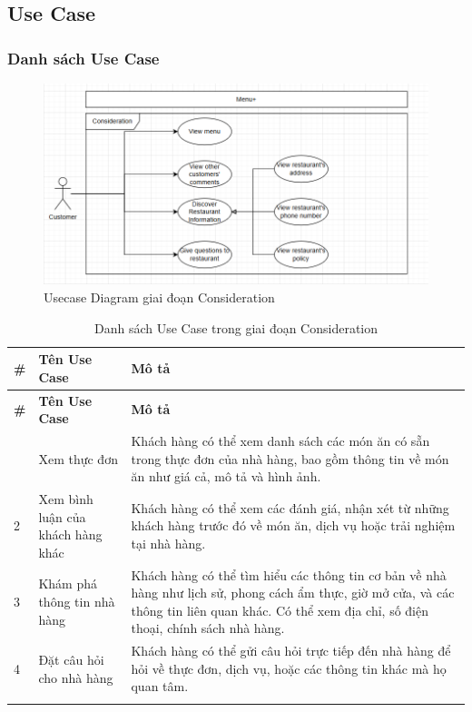 \subsection{Use Case}
    \subsubsection{Danh sách Use Case}
        \begin{figure}[H]
	\centering
	\includegraphics[width=\linewidth]{Images/ucd-consideration.png}
	\caption{Usecase Diagram giai đoạn Consideration}
        \end{figure}
        
        \begin{longtable}{|p{1cm}|p{5cm}|p{9cm}|}
        \hline
        \textbf{\#} & \textbf{Tên Use Case} & \textbf{Mô tả} \\ 
        \hline
        \endfirsthead
        \hline
        \textbf{\#} & \textbf{Tên Use Case} & \textbf{Mô tả} \\ 
        \endhead
        \hline
        \endfoot
        \hline
        \endlastfoot
        1 & Xem thực đơn & Khách hàng có thể xem danh sách các món ăn có sẵn trong thực đơn của nhà hàng, bao gồm thông tin về món ăn như giá cả, mô tả và hình ảnh. \\ 
        \hline
        2 & Xem bình luận của khách hàng khác & Khách hàng có thể xem các đánh giá, nhận xét từ những khách hàng trước đó về món ăn, dịch vụ hoặc trải nghiệm tại nhà hàng. \\ 
        \hline
        3 & Khám phá thông tin nhà hàng & Khách hàng có thể tìm hiểu các thông tin cơ bản về nhà hàng như lịch sử, phong cách ẩm thực, giờ mở cửa, và các thông tin liên quan khác. Có thể xem địa chỉ, số điện thoại, chính sách nhà hàng.\\ 
        \hline
        4 & Đặt câu hỏi cho nhà hàng & Khách hàng có thể gửi câu hỏi trực tiếp đến nhà hàng để hỏi về thực đơn, dịch vụ, hoặc các thông tin khác mà họ quan tâm. \\ 
        \hline
        \caption{Danh sách Use Case trong giai đoạn Consideration}\\
        \end{longtable}

